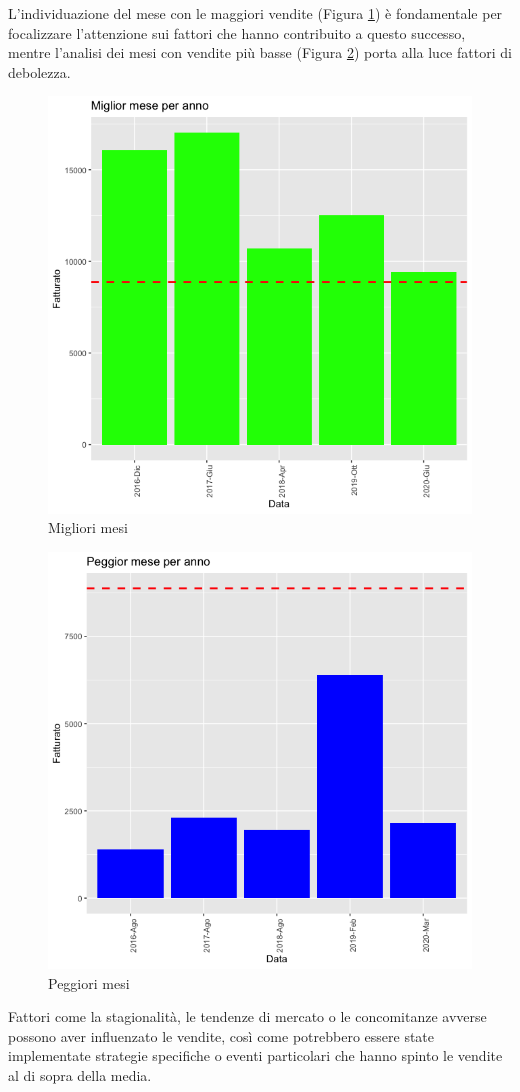 L'individuazione del mese con le maggiori vendite (Figura \ref{fig:max}) è fondamentale per focalizzare l'attenzione sui fattori che hanno contribuito a questo successo, mentre l'analisi dei mesi con vendite più basse (Figura \ref{fig:min}) porta alla luce fattori di debolezza. 
\begin{figure}[H]
    \centering
    \includegraphics[scale=.3]{img/max.png}
    \caption{Migliori mesi}
        \label{fig:max}
\end{figure}
\begin{figure}[H]
    \centering
    \includegraphics[scale=.3]{img/min.png}
    \caption{Peggiori mesi}
        \label{fig:min}
\end{figure}
Fattori come la stagionalità, le tendenze di mercato o le concomitanze avverse possono aver influenzato le vendite, così come potrebbero essere state implementate strategie specifiche o eventi particolari che hanno spinto le vendite al di sopra della media.
